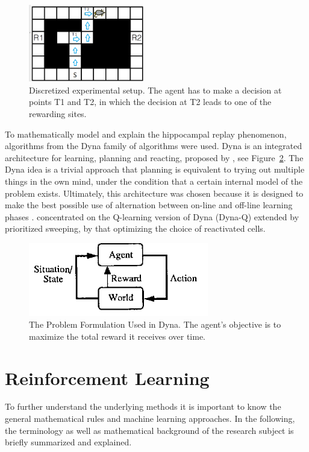 \documentclass[a4paper]{article}
\begin{document}
	\begin{figure}[t]
		\centering
		\includegraphics[angle=0,width=0.45\textwidth]{./figs/setup.png}
		\caption{\label{fig:setup}Discretized experimental setup. The agent has to make a decision at points T1 and T2, in which the decision at T2 leads to one of the rewarding sites. \citep{NeuralDynaQ}}
	\end{figure}
	
	\par To mathematically model and explain the hippocampal replay phenomenon, algorithms from the Dyna family of algorithms were used. Dyna is an integrated architecture for learning, planning and reacting, proposed by \cite{Dyna}, see Figure~\ref{fig:dyna}. The Dyna idea is a trivial approach that planning is equivalent to trying out multiple things in the own mind, under the condition that a certain internal model of the problem exists. Ultimately, this architecture was chosen because it is designed to make the best possible use of alternation between on-line and off-line learning phases \citep{Dyna}. \cite{NeuralDynaQ} concentrated on the Q-learning version of Dyna (Dyna-Q) extended by prioritized sweeping, by that optimizing the choice of reactivated cells.
	
	
	\begin{figure}[b]
		\centering
		\includegraphics[angle=0,width=0.7\textwidth]{./figs/Dyna-Figure1.png}
		\caption{\label{fig:dyna}The Problem Formulation Used in Dyna. The agent's objective is to maximize the total reward it receives over time. \citep{Dyna}}
	\end{figure}
	\newpage
	\section{Reinforcement Learning}
	To further understand the underlying methods it is important to know the general mathematical rules and machine learning approaches. In the following, the terminology as well as mathematical background of the research subject is briefly summarized and explained. 
	
\end{document}
